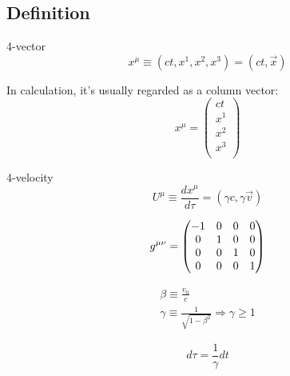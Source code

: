 \subsection{Definition}
\begin{description}
    \item {4-vector}
	\begin{equation}
	    \label{eqn:sr::4vectors}
		x^\mu \equiv (ct, x^1, x^2, x^3) = (ct, \vec{x})
	\end{equation}

	In calculation, it's usually regarded as a column vector:
	\begin{equation}
	    x^\mu = 
	    \begin{pmatrix}
		ct	\\
		x^1	\\
		x^2	\\
		x^3	\\
	    \end{pmatrix}
	\end{equation}

    \item{4-velocity}
	\begin{equation}
	    \label{eqn:sr::4velocity}
	    U^\mu \equiv \frac{dx^\mu}{d\tau} = (\gamma c, \gamma \vec{v})
	\end{equation}

    \item[metric tensor] 
	\begin{equation}
	    \label{eqn:sr::metricTensor}
	    g^{\mu\nu} = 
	    \begin{pmatrix}
		-1  & 0	& 0 & 0	\\
		0   & 1	& 0 & 0 \\
		0   & 0	& 1 & 0 \\
		0   & 0	& 0 & 1 \\
	    \end{pmatrix}
	\end{equation}
    \item [$\beta$, $\gamma$]
	\begin{equation}
	    \label{eqn:sm::betaGamma}
	    \begin{gathered}
		\beta \equiv \frac{v_0}{c} \\
		\gamma	\equiv \frac{1}{\sqrt{1-\beta^2}}	\Rightarrow \gamma \ge 1
	    \end{gathered}
	\end{equation}

    \item [Proper time]
	\begin{equation}
	    \label{eqn:sr::properTime}
	    d\tau = \frac{1}{\gamma}dt
	\end{equation}
\end{description}
